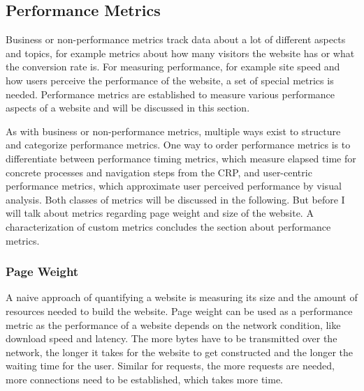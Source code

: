 


\subsection{Performance Metrics}

Business or non-performance metrics track data about a lot of different aspects and topics, for example metrics about how many visitors the website has or what the conversion rate is.
For measuring performance, for example site speed and how users perceive the performance of the website, a set of special metrics is needed.
Performance metrics are established to measure various performance aspects of a website and will be discussed in this section.




As with business or non-performance metrics, multiple ways exist to structure and categorize performance metrics.
One way to order performance metrics is to differentiate between performance timing metrics, which measure elapsed time for concrete processes and navigation steps from the CRP, and user-centric performance metrics, which approximate user perceived performance by visual analysis.
Both classes of metrics will be discussed in the following.
But before I will talk about metrics regarding page weight and size of the website.
A characterization of custom metrics concludes the section about performance metrics.






\subsubsection{Page Weight}

A naive approach of quantifying a website is measuring its size and the amount of resources needed to build the website.
Page weight can be used as a performance metric as the performance of a website depends on the network condition, like download speed and latency.
The more bytes have to be transmitted over the network, the longer it takes for the website to get constructed and the longer the waiting time for the user.
Similar for requests, the more requests are needed, more connections need to be established, which takes more time.

